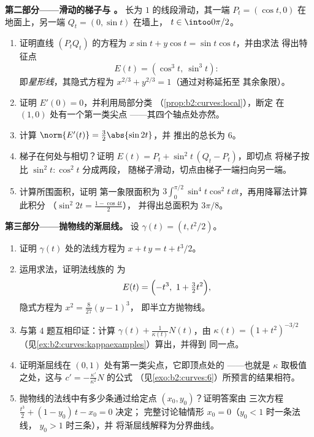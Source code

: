 \begin{problem}
\medskip
\noindent\textbf{第二部分——滑动的梯子与
。} 长为 $1$ 的线段滑动，其一端 $P_t =
(\cos t, 0)$ 在地面上，另一端 $Q_t = (0, \sin t)$ 在墙上，
$t \in \intoo0{\pi/2}$。
\begin{enumerate}[resume]
  \item 证明直线 $(P_tQ_t)$ 的方程为 $x\sin t +
        y\cos t = \sin t\cos t$，并由求法
        得出特征点
        \[
        E(t) = (\cos^3 t,\ \sin^3 t) :
        \]
        即\emph{星形线}，其隐式方程为
        $x^{2/3} + y^{2/3} = 1$（通过对称延拓至
        其余象限）。
  \item 证明 $E'(0) = 0$，并利用局部分类
        （\cref{prop:b2:curves:local}），断定
        在 $(1, 0)$ 处有一个第一类尖点
——其四个轴点处亦然。
  \item 计算 $\norm{E'(t)} = \tfrac32\abs{\sin 2t}$，并
        推出的总长为 $6$。
  \item 梯子在何处与相切？证明 $E(t) =
        P_t + \sin^2 t\,(Q_t - P_t)$，即切点
        将梯子按比 $\sin^2 t : \cos^2
        t$ 分成两段，
        随梯子滑动，切点由梯子一端扫向另一端。
  \item 计算所围面积，证明
        第一象限面积为 $3\int_0^{\pi/2}\sin^4
        t\cos^2 t\,\dd t$，再用降幂法计算此积分
        （$\sin^2 2t = \tfrac{1 - \cos 4t}2$），
        并得出总面积为 $3\pi/8$。
\end{enumerate}

\medskip
\noindent\textbf{第三部分——抛物线的渐屈线。}
设 $\gamma(t) = (t, t^2/2)$。
\begin{enumerate}[resume]
  \item 证明 $\gamma(t)$ 处的法线方程为
        $x + t\,y = t + t^3/2$。
  \item 运用求法，证明法线族的
        为
        \[
        E(t) = \Bigl(-t^3,\ 1 + \tfrac32 t^2\Bigr),
        \]
        隐式方程为 $x^2 = \tfrac8{27}(y - 1)^3$，
        即半立方抛物线。
  \item 与第 4 题互相印证：计算
         $\gamma(t) + \frac1{\kappa(t)}N(t)$，由
        $\kappa(t) = (1 + t^2)^{-3/2}$
        （见\cref{ex:b2:curves:kappaexamples}）算出，并得到
        同一点。
  \item 证明渐屈线在
        $(0, 1)$ 处有第一类尖点，它即顶点处的
——也就是 $\kappa$ 取极值之处，这与
        $c' = -\frac{\kappa'}{\kappa^2}N$ 的公式
        （见\cref{exo:b2:curves:6}）所预言的结果相符。
  \item 抛物线的法线中有多少条通过给定点
        $(x_0, y_0)$？证明答案由
        三次方程 $\tfrac{t^3}2 + (1 - y_0)\,t - x_0 = 0$ 决定；
        完整讨论轴情形 $x_0 = 0$（$y_0 < 1$ 时一条法线，
        $y_0 > 1$ 时三条），并
        将渐屈线解释为分界曲线。
\end{enumerate}


\end{problem}
